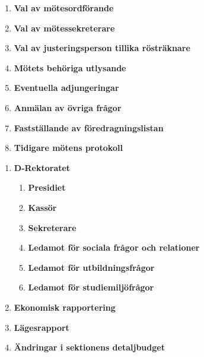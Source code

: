 \documentclass{dagordning}
\begin{document}


  \begin{enumerate}
    \item \textbf{Val av mötesordförande}
    \item \textbf{Val av mötessekreterare}
    \item \textbf{Val av justeringsperson tillika rösträknare}
    \item \textbf{Mötets behöriga utlysande}
    \item \textbf{Eventuella adjungeringar}
    \item \textbf{Anmälan av övriga frågor}
    \item \textbf{Fastställande av föredragningslistan}
    \item \textbf{Tidigare mötens protokoll}
  \end{enumerate}


  \begin{enumerate}
    \item \textbf{D-Rektoratet}
	\begin{enumerate}
        \item \textbf{Presidiet}
        \item \textbf{Kassör}
        \item \textbf{Sekreterare}
        \item \textbf{Ledamot för sociala frågor och relationer}
        \item \textbf{Ledamot för utbildningsfrågor}
        \item \textbf{Ledamot för studiemiljöfrågor}
	\end{enumerate}
    \item \textbf{Ekonomisk rapportering}
        \item \textbf{Lägesrapport}
        \item \textbf{Ändringar i sektionens detaljbudget}
  \end{enumerate}






\end{document}
